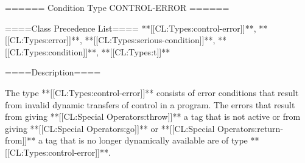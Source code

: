 ====== Condition Type CONTROL-ERROR ======

====Class Precedence List==== **[[CL:Types:control-error]]**, **[[CL:Types:error]]**, **[[CL:Types:serious-condition]]**, **[[CL:Types:condition]]**, **[[CL:Types:t]]**

====Description====

The type **[[CL:Types:control-error]]** consists of error conditions that result from invalid dynamic transfers of control in a program. The errors that result from giving **[[CL:Special Operators:throw]]** a tag that is not active or from giving **[[CL:Special Operators:go]]** or **[[CL:Special Operators:return-from]]** a tag that is no longer dynamically available are of type **[[CL:Types:control-error]]**.

